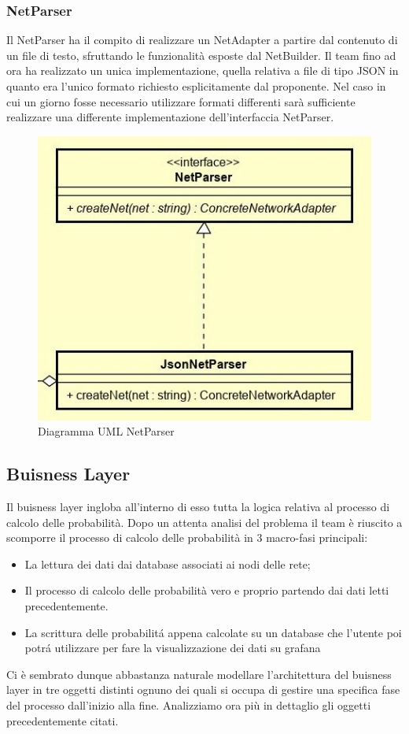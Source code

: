 \subsubsection{NetParser}
Il NetParser ha il compito di realizzare un NetAdapter a partire dal contenuto di un file di testo, sfruttando le funzionalità esposte dal NetBuilder.
Il team fino ad ora ha realizzato un unica implementazione, quella relativa a file di tipo JSON in quanto era l'unico formato richiesto esplicitamente dal proponente.
Nel caso in cui un giorno fosse necessario utilizzare formati differenti sarà sufficiente realizzare una differente implementazione dell'interfaccia NetParser.
\begin{figure} [H]
	\centering
	\includegraphics[scale=1]{Img/NetParser}
	\caption{Diagramma UML NetParser}\label{}
\end{figure}
\subsection{Buisness Layer}
Il buisness layer ingloba all'interno di esso tutta la logica relativa al processo di calcolo delle probabilità.
Dopo un attenta analisi del problema il team è riuscito a scomporre il processo di calcolo delle probabilità in 3 macro-fasi principali:
\begin{itemize}
	\item La lettura dei dati dai database associati ai nodi delle rete;
	\item Il processo di calcolo delle probabilità vero e proprio partendo dai dati letti precedentemente.
	\item La scrittura delle probabilitá appena calcolate su un database che l'utente poi potrá utilizzare per fare la visualizzazione dei dati su grafana
\end{itemize}
Ci è sembrato dunque abbastanza naturale modellare l'architettura del buisness layer in tre oggetti distinti ognuno dei quali si occupa di gestire una specifica fase del processo dall'inizio alla fine.
Analizziamo ora più in dettaglio gli oggetti precedentemente citati.

